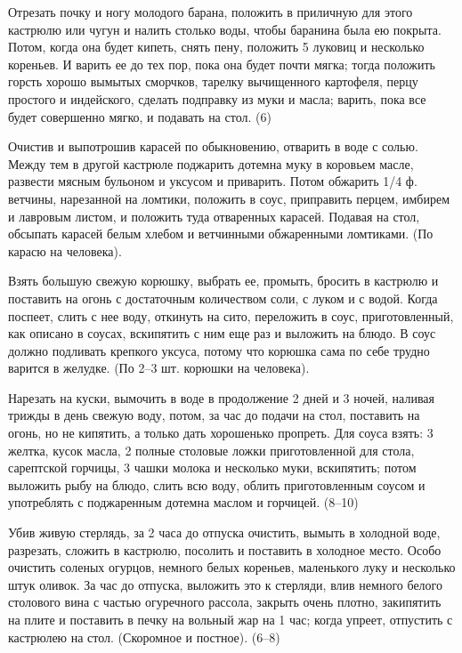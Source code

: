 
Отрезать почку и ногу молодого барана, положить в приличную для этого кастрюлю или чугун и налить столько воды, чтобы баранина была ею покрыта. Потом, когда она будет кипеть, снять пену, положить 5 луковиц и несколько кореньев. И варить ее до тех пор, пока она будет почти мягка; тогда положить горсть хорошо вымытых сморчков, тарелку вычищенного картофеля, перцу простого и индейского, сделать подправку из муки и масла; варить, пока все будет совершенно мягко, и подавать на стол. (6) 


Очистив и выпотрошив карасей по обыкновению, отварить в воде с солью. Между тем в другой кастрюле поджарить дотемна муку в коровьем масле, развести мясным бульоном и уксусом и приварить. Потом обжарить 1/4 ф. ветчины, нарезанной на ломтики, положить в соус, приправить перцем, имбирем и лавровым листом, и положить туда отваренных карасей. Подавая на стол, обсыпать карасей белым хлебом и ветчинными обжаренными ломтиками. (По карасю на человека). 


Взять большую свежую корюшку, выбрать ее, промыть, бросить в кастрюлю и поставить на огонь с достаточным количеством соли, с луком и с водой. Когда поспеет, слить с нее воду, откинуть на сито, переложить в соус, приготовленный, как описано в соусах, вскипятить с ним еще раз и выложить на блюдо. В соус должно подливать крепкого уксуса, потому что корюшка сама по себе трудно варится в желудке. (По 2--3 шт. корюшки на человека). 


Нарезать на куски, вымочить в воде в продолжение 2 дней и 3 ночей, наливая трижды в день свежую воду, потом, за час до подачи на стол, поставить на огонь, но не кипятить, а только дать хорошенько пропреть. Для соуса взять: 3 желтка, кусок масла, 2 полные столовые ложки приготовленной для стола, сарептской горчицы, 3 чашки молока и несколько муки, вскипятить; потом выложить рыбу на блюдо, слить всю воду, облить приготовленным соусом и употреблять с поджаренным дотемна маслом и горчицей. (8--10) 


Убив живую стерлядь, за 2 часа до отпуска очистить, вымыть в холодной воде, разрезать, сложить в кастрюлю, посолить и поставить в холодное место. Особо очистить соленых огурцов, немного белых кореньев, маленького луку и несколько штук оливок. За час до отпуска, выложить это к стерляди, влив немного белого столового вина с частью огуречного рассола, закрыть очень плотно, закипятить на плите и поставить в печку на вольный жар на 1 час; когда упреет, отпустить с кастрюлею на стол. (Скоромное и постное). (6--8) 

